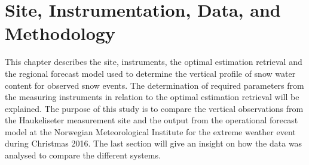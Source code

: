 \chapter{Site, Instrumentation, Data, and Methodology}\label{ch:Methods}

This chapter describes the site, instruments, the optimal estimation retrieval and the regional forecast model used to determine the vertical profile of snow water content for observed snow events. 
The determination of required parameters from the measuring instruments in relation to the optimal estimation retrieval will be explained. The purpose of this study is to compare the vertical observations from the Haukeliseter measurement site and the output from the operational forecast model at the Norwegian Meteorological Institute for the extreme weather event during Christmas 2016. 
The last section will give an insight on how the data was analysed to compare the different systems. 










